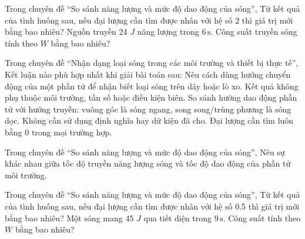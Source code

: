 \begin{ex}
Trong chuyên đề “So sánh năng lượng và mức độ dao động của sóng”, Từ kết quả của tình huống sau, nếu đại lượng cần tìm được nhân với hệ số 2 thì giá trị mới bằng bao nhiêu? Nguồn truyền 24 $J$ năng lượng trong $6\,\text{s}$. Công suất truyền sóng tính theo $W$ bằng bao nhiêu?
\end{ex}

\begin{ex}
Trong chuyên đề “Nhận dạng loại sóng trong các môi trường và thiết bị thực tế”, Kết luận nào phù hợp nhất khi giải bài toán sau: Nêu cách dùng hướng chuyển động của một phần tử để nhận biết loại sóng trên dây hoặc lò xo.
\choice
{Kết quả không phụ thuộc môi trường, tần số hoặc điều kiện biên.}
{\True So sánh hướng dao động phần tử với hướng truyền: vuông góc là sóng ngang, song song/trùng phương là sóng dọc.}
{Không cần sử dụng định nghĩa hay dữ kiện đã cho.}
{Đại lượng cần tìm luôn bằng 0 trong mọi trường hợp.}
\end{ex}

\begin{ex}
Trong chuyên đề “So sánh năng lượng và mức độ dao động của sóng”, Nêu sự khác nhau giữa tốc độ truyền năng lượng sóng và tốc độ dao động của phần tử môi trường.
\choiceTF

\end{ex}

\begin{ex}
Trong chuyên đề “So sánh năng lượng và mức độ dao động của sóng”, Từ kết quả của tình huống sau, nếu đại lượng cần tìm được nhân với hệ số 0.5 thì giá trị mới bằng bao nhiêu? Một sóng mang 45 $J$ qua tiết diện trong $9\,\text{s}$. Công suất tính theo $W$ bằng bao nhiêu?
\end{ex}


